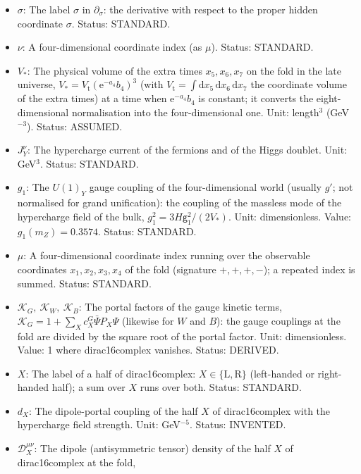 \documentclass[
  10pt,
]{article}
\begin{document}
\begin{itemize}
\item
  \(\sigma\): The label \(\sigma\) in \(\partial_\sigma\): the
  derivative with respect to the proper hidden coordinate \(\sigma\).
  Status: STANDARD.
\item
  \(\nu\): A four-dimensional coordinate index (as \(\mu\)). Status:
  STANDARD.
\item
  \(V_*\): The physical volume of the extra times \(x_5, x_6, x_7\) on
  the fold in the late universe,
  \(V_* = V_{\mathrm{t}}(\mathrm{e}^{-a_4}b_4)^3\) (with
  \(V_{\mathrm{t}} = \int\mathrm{d}x_5\,\mathrm{d}x_6\,\mathrm{d}x_7\)
  the coordinate volume of the extra times) at a time when
  \(\mathrm{e}^{-a_4}b_4\) is constant; it converts the
  eight-dimensional normalisation into the four-dimensional one. Unit:
  length\(^3\) (GeV\(^{-3}\)). Status: ASSUMED.
\item
  \(J_Y^\nu\): The hypercharge current of the fermions and of the Higgs
  doublet. Unit: GeV\(^3\). Status: STANDARD.
\item
  \(g_1\): The \(U(1)_Y\) gauge coupling of the four-dimensional world
  (usually \(g'\); not normalised for grand unification): the coupling
  of the massless mode of the hypercharge field of the bulk,
  \(g_1^2 = 3H\mathsf{g}_1^2/(2V_*)\). Unit: dimensionless. Value:
  \(g_1(m_Z) = 0.3574\). Status: STANDARD.
\item
  \(\mu\): A four-dimensional coordinate index running over the
  observable coordinates \(x_1, x_2, x_3, x_4\) of the fold (signature
  \(+,+,+,-\)); a repeated index is summed. Status: STANDARD.
\item
  \(\mathcal{K}_{G},\ \mathcal{K}_{W},\ \mathcal{K}_{B}\): The portal
  factors of the gauge kinetic terms,
  \(\mathcal{K}_{G} = 1 + \sum_Xc^{G}_X\bar\Psi P_X\Psi\) (likewise for
  \(W\) and \(B\)): the gauge couplings at the fold are divided by the
  square root of the portal factor. Unit: dimensionless. Value: 1 where
  dirac16complex vanishes. Status: DERIVED.
\item
  \(X\): The label of a half of dirac16complex:
  \(X \in \{\mathrm{L}, \mathrm{R}\}\) (left-handed or right-handed
  half); a sum over \(X\) runs over both. Status: STANDARD.
\item
  \(d_X\): The dipole-portal coupling of the half \(X\) of
  dirac16complex with the hypercharge field strength. Unit:
  GeV\(^{-5}\). Status: INVENTED.
\item
  \(\mathcal{D}_X^{\mu\nu}\): The dipole (antisymmetric tensor) density
  of the half \(X\) of dirac16complex at the fold,

\end{itemize}
\end{document}
